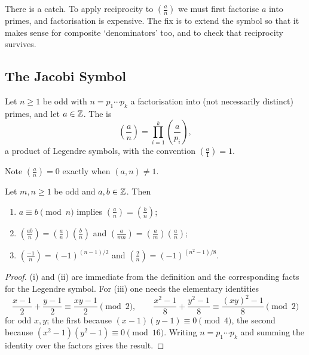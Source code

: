 \documentclass[a4paper]{scrartcl}
\newcommand{\leg}[2]{\left( \frac{#1}{#2} \right)}
\begin{document}
There is a catch. To apply reciprocity to $\left( \frac an \right)$ we must first factorise $a$ into primes, and factorisation is expensive. The fix is to extend the symbol so that it makes sense for composite `denominators' too, and to check that reciprocity survives.

\subsection{The Jacobi Symbol}

\begin{definition}
	Let $n \geq 1$ be odd with $n = p_1 \cdots p_k$ a factorisation into (not necessarily distinct) primes, and let $a \in \mathbb{Z}$. The  is
	$$
	\leg an = \prod_{i=1}^k \leg a{p_i},
	$$
	a product of Legendre symbols, with the convention $\left( \frac a1 \right) = 1$.
\end{definition}

Note $\left( \frac an \right) = 0$ exactly when $(a, n) \neq 1$.

\begin{proposition}\label{prop:jacobi}
	Let $m, n \geq 1$ be odd and $a, b \in \mathbb{Z}$. Then
	\begin{enumerate}[label=(\roman*)]
		\item $a \equiv b \pmod n$ implies $\left( \frac an \right) = \left( \frac bn \right)$;
		\item $\left( \frac{ab}n \right) = \left( \frac an \right)\left( \frac bn \right)$ and $\left( \frac a{mn} \right) = \left( \frac am \right)\left( \frac an \right)$;
		\item $\left( \frac{-1}n \right) = (-1)^{(n-1)/2}$ and $\left( \frac 2n \right) = (-1)^{(n^2 - 1)/8}$.
	\end{enumerate}
\end{proposition}
\begin{proof}
	(i) and (ii) are immediate from the definition and the corresponding facts for the Legendre symbol. For (iii) one needs the elementary identities
	$$
	\frac{x - 1}{2} + \frac{y-1}2 \equiv \frac{xy - 1}{2} \pmod 2, \qquad \frac{x^2 - 1}8 + \frac{y^2 - 1}8 \equiv \frac{(xy)^2 - 1}8 \pmod 2
	$$
	for odd $x, y$; the first because $(x-1)(y-1) \equiv 0 \pmod 4$, the second because $(x^2 - 1)(y^2-1) \equiv 0 \pmod{16}$. Writing $n = p_1 \cdots p_k$ and summing the identity over the factors gives the result.
\end{proof}
\end{document}
